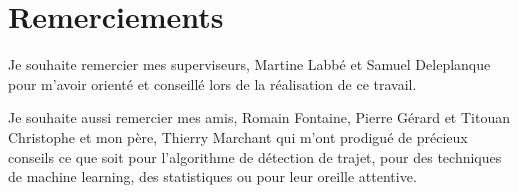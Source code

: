 \documentclass[letterpaper]{article}
\begin{document}
\section{Remerciements}

Je souhaite remercier mes superviseurs, Martine Labbé et Samuel Deleplanque pour m'avoir orienté et conseillé lors de la réalisation de ce travail.

Je souhaite aussi remercier mes amis, Romain Fontaine, Pierre Gérard et Titouan Christophe et mon père, Thierry Marchant qui m'ont prodigué de précieux conseils ce que soit pour l'algorithme de détection de trajet, pour des techniques de machine learning, des statistiques ou pour leur oreille attentive.

\footnotesize


\end{document}
